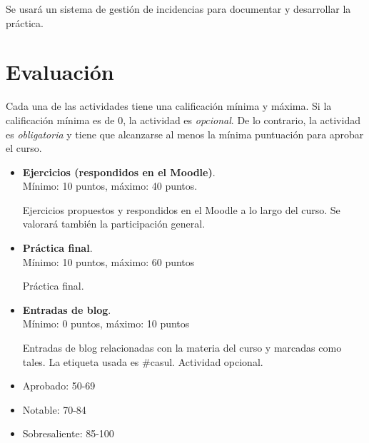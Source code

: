 \documentclass[a4paper]{article}
\begin{document}
      Se usará un sistema de gestión de incidencias para documentar y desarrollar la práctica.
      

  \section{Evaluación}
  Cada una de las actividades tiene una calificación mínima y máxima. Si la calificación mínima es de 0, la actividad es \textit{opcional}. De lo contrario, la actividad es 
\textit{obligatoria} y tiene que alcanzarse al menos la mínima puntuación para aprobar el curso.

  \begin{itemize}
    \item \textbf{Ejercicios (respondidos en el Moodle)}. \\
    Mínimo: 10 puntos, máximo: 40 puntos.

    Ejercicios propuestos y respondidos en el Moodle a lo largo del curso. Se valorará también la participación general.
    \item \textbf{Práctica final}. \\
    Mínimo: 10 puntos, máximo: 60 puntos

    Práctica final. 
    \item \textbf{Entradas de blog}. \\
    Mínimo: 0 puntos, máximo: 10 puntos

    Entradas de blog relacionadas con la materia del curso y marcadas como tales. La etiqueta usada es \#casul. Actividad opcional. 
  \end{itemize} 

  \begin{itemize}
    \item Aprobado: 50-69
    \item Notable: 70-84
    \item Sobresaliente: 85-100
  \end{itemize}

\end{document}
